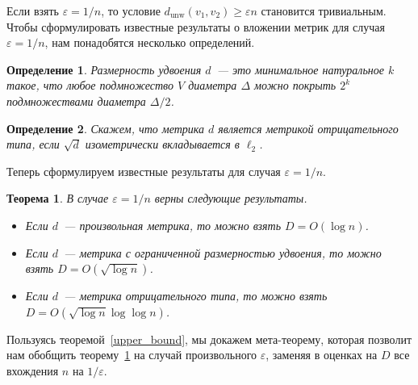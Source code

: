 \documentclass[12pt]{article}
\newcommand{\eps}{\varepsilon}
\newcommand{\dunw}{d_{\mathrm{unw}}}
\newtheorem{definition}{Определение}
\newtheorem{theorem}{Теорема}
\begin{document}
    Если взять $\eps = 1/n$, то условие $\dunw(v_1, v_2) \geq \eps n$ становится тривиальным.
    Чтобы сформулировать известные результаты о вложении метрик для случая $\eps = 1/n$, нам понадобятся несколько
    определений.

    \begin{definition}
        \emph{Размерность удвоения} $d$~--- это минимальное натуральное $k$ такое, что любое подмножество $V$
        диаметра $\Delta$ можно покрыть $2^k$ подмножествами диаметра $\Delta / 2$.
    \end{definition}
    \begin{definition}
        Скажем, что метрика $d$ является \emph{метрикой отрицательного типа}, если $\sqrt{d}$ изометрически
        вкладывается в $\ell_2$.
    \end{definition}

    Теперь сформулируем известные результаты для случая $\eps = 1/n$.

    \begin{theorem}
        \label{embeddings}
        В случае $\eps = 1 / n$ верны следующие результаты.
        \begin{itemize}
            \item
            \cite{B85} Если $d$~--- произвольная метрика, то можно взять $D = O(\log n)$. 
            \item
            \cite{GKL03} Если $d$~--- метрика с ограниченной размерностью удвоения, то можно взять $D = O(\sqrt{\log n})$.
            \item
            \cite{ALN05} Если $d$~--- метрика отрицательного типа, то можно взять $D = O(\sqrt{\log n} \log \log n)$.
        \end{itemize}
    \end{theorem}

    Пользуясь теоремой~\ref{upper_bound}, мы докажем мета-теорему, которая позволит нам обобщить теорему~\ref{embeddings}
    на случай произвольного $\eps$, заменяя в оценках на $D$ все вхождения $n$ на $1 / \eps$.
\end{document}

